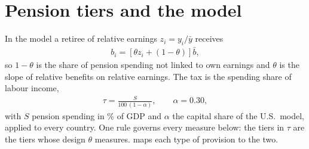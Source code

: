 \section{Pension tiers and the model}\label{sec:data:tiers}
In the model a retiree of relative earnings $z_i = y_i/\bar y$ receives
\begin{align}
    b_i = \left[\theta z_i + (1-\theta)\right]\bar b, \label{eq:data:benefit}
\end{align}
so $1-\theta$ is the share of pension spending not linked to own earnings and $\theta$ is the slope of relative benefits on relative earnings. The tax is the spending share of labour income,
\begin{align}
    \tau = \frac{S}{100\,(1-\alpha)}, \qquad \alpha = 0.30, \label{eq:data:tau}
\end{align}
with $S$ pension spending in \% of GDP and $\alpha$ the capital share of the U.S.\ model, applied to every country. One rule governs every measure below: the tiers in $\tau$ are the tiers whose design $\theta$ measures.  maps each type of provision to the two.

